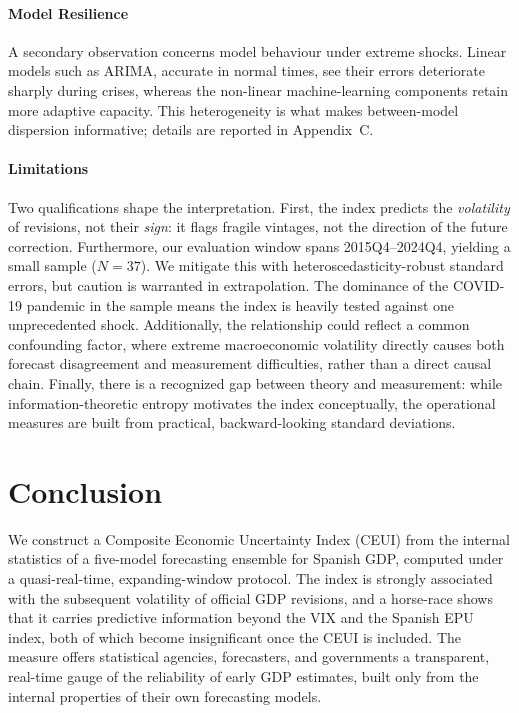 \documentclass[12pt,a4paper]{article}
\theoremstyle{remark}
\begin{document}
\paragraph{Model Resilience}
A secondary observation concerns model behaviour under extreme shocks. Linear models such as ARIMA, accurate in normal times, see their errors deteriorate sharply during crises, whereas the non-linear machine-learning components retain more adaptive capacity. This heterogeneity is what makes between-model dispersion informative; details are reported in Appendix~C.

\paragraph{Limitations}
Two qualifications shape the interpretation. First, the index predicts the \emph{volatility} of revisions, not their \emph{sign}: it flags fragile vintages, not the direction of the future correction. Furthermore, our evaluation window spans 2015Q4--2024Q4, yielding a small sample ($N = 37$). We mitigate this with heteroscedasticity-robust standard errors, but caution is warranted in extrapolation. The dominance of the COVID-19 pandemic in the sample means the index is heavily tested against one unprecedented shock. Additionally, the relationship could reflect a common confounding factor, where extreme macroeconomic volatility directly causes both forecast disagreement and measurement difficulties, rather than a direct causal chain. Finally, there is a recognized gap between theory and measurement: while information-theoretic entropy motivates the index conceptually, the operational measures are built from practical, backward-looking standard deviations.

\section{Conclusion}
\label{sec:conclusion}

We construct a Composite Economic Uncertainty Index (CEUI) from the internal statistics of a five-model forecasting ensemble for Spanish GDP, computed under a quasi-real-time, expanding-window protocol. The index is strongly associated with the subsequent volatility of official GDP revisions, and a horse-race shows that it carries predictive information beyond the VIX and the Spanish EPU index, both of which become insignificant once the CEUI is included. The measure offers statistical agencies, forecasters, and governments a transparent, real-time gauge of the reliability of early GDP estimates, built only from the internal properties of their own forecasting models. 
\end{document}
